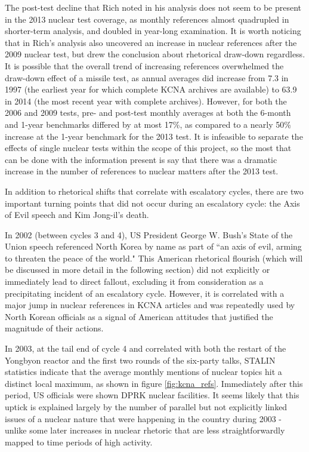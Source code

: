 The post-test decline that Rich\cite{rich14} noted in his analysis does not seem to be present in the 2013 nuclear test coverage, as monthly references almost quadrupled in shorter-term analysis, and doubled in year-long examination. It is worth noticing that in Rich's analysis also uncovered an increase in nuclear references after the 2009 nuclear test, but drew the conclusion about rhetorical draw-down regardless. It is possible that the overall trend of increasing references overwhelmed the draw-down effect of a missile test, as annual averages did increase from 7.3 in 1997 (the earliest year for which complete KCNA archives are available) to 63.9 in 2014 (the most recent year with complete archives). However, for both the 2006 and 2009 tests, pre- and post-test monthly averages at both the 6-month and 1-year benchmarks differed by at most 17\%, as compared to a nearly 50\% increase at the 1-year benchmark for the 2013 test. It is infeasible to separate the effects of single nuclear tests within the scope of this project, so the most that can be done with the information present is say that there was a dramatic increase in the number of references to nuclear matters after the 2013 test.

In addition to rhetorical shifts that correlate with escalatory cycles, there are two important turning points that did not occur during an escalatory cycle: the Axis of Evil speech and Kim Jong-il's death.

In 2002 (between cycles 3 and 4), US President George W. Bush's State of the Union speech referenced North Korea by name as part of ``an axis of evil, arming to threaten the peace of the world."\cite{sotu02} This American rhetorical flourish (which will be discussed in more detail in the following section) did not explicitly or immediately lead to direct fallout, excluding it from consideration as a precipitating incident of an escalatory cycle. However, it is correlated with a major jump in nuclear references in KCNA articles \cite{rich14} and was repeatedly used by North Korean officials as a signal of American attitudes that justified the magnitude of their actions\cite{bleiker}.

In 2003, at the tail end of cycle 4 and correlated with both the restart of the Yongbyon reactor and the first two rounds of the six-party talks, STALIN statistics indicate that the average monthly mentions of nuclear topics hit a distinct local maximum, as shown in figure \ref{fig:kcna_refs}. Immediately after this period, US officials were shown DPRK nuclear facilities. It seems likely that this uptick is explained largely by the number of parallel but not explicitly linked issues of a nuclear nature that were happening in the country during 2003 - unlike some later increases in nuclear rhetoric that are less straightforwardly mapped to time periods of high activity.

